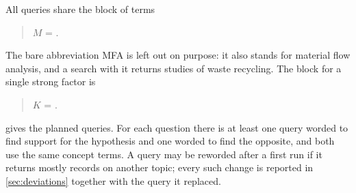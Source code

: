 All queries share the block of terms
\begin{quote}
  $M$ =  
   
     
  .
\end{quote}
The bare abbreviation MFA is left out on purpose: it also stands for
material flow analysis, and a search with it returns studies of waste
recycling.
The block for a single strong factor is
\begin{quote}
  $K$ =     
      
  .
\end{quote}
 gives the planned queries.
For each question there is at least one query worded to find support for
the hypothesis and one worded to find the opposite, and both use the
same concept terms.
A query may be reworded after a first run if it returns mostly records
on another topic; every such change is reported in \cref{sec:deviations}
together with the query it replaced.
